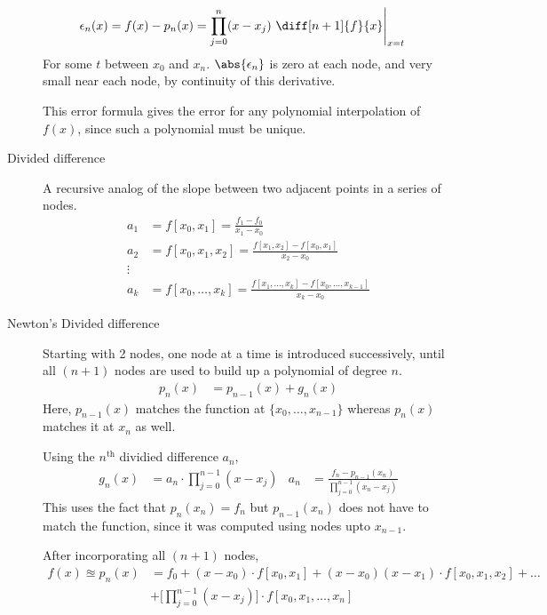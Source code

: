 \begin{description}
        \begin{align}
            \epsilon_n(x) & = f(x) - p_n(x)
            = \prod_{j=0}^{n} (x-x_j)\ \diff[n+1]{f}{x} \Bigg|_{x=t}
        \end{align}
        For some $ t $ between $ x_0 $ and $ x_n $. $ \abs{\epsilon_n} $ is zero at
        each node, and very small near each node, by continuity of this derivative.
        \par
        This error formula gives the error for any polynomial interpolation of $ f(x) $,
        since such a polynomial must be unique.

    \item[Divided difference] A recursive analog of the slope between two adjacent points
        in a series of nodes.
        \begin{align}
            a_1 & = f[x_0,x_1] = \frac{f_1 - f_0}{x_1 - x_0}                          \\
            a_2 & = f[x_0, x_1, x_2] = \frac{f[x_1,x_2] - f[x_0,x_1]}{x_2 - x_0}      \\
            \vdots \nonumber                                                          \\
            a_k & = f[x_0,\dots,x_k] = \frac{f[x_1,\dots,x_k] - f[x_0,\dots,x_{k-1}]}
            {x_k - x_0}
        \end{align}

    \item[Newton's Divided difference] Starting with 2 nodes, one node at a time is
        introduced successively, until all $ (n+1) $ nodes are used to build up a
        polynomial of degree $ n $.
        \begin{align}
            p_n(x) & = p_{n-1}(x) + g_n(x)
        \end{align}
        Here, $ p_{n-1}(x) $ matches the function at $ \{x_0,\dots,x_{n-1}\} $ whereas
        $ p_n(x) $ matches it at $ x_n $ as well. \par
        Using the $ n^{\text{th}} $ dividied difference $ a_n $,
        \begin{align}
            g_n(x) & = a_n \cdot \prod_{j=0}^{n-1} (x - x_j)                   &
            a_n    & = \frac{f_n - p_{n-1}(x_n)}{\prod_{j=0}^{n-1}(x_n - x_j)}
        \end{align}
        This uses the fact that $ p_n(x_n) = f_n $ but $ p_{n-1}(x_n) $ does not have to
        match the function, since it was computed using nodes upto $ x_{n-1} $. \par
        After incorporating all $ (n+1) $ nodes,
        \begin{align}
            f(x) \approxeq p_n(x) & = f_0 + (x - x_0) \cdot f[x_0, x_1]
            + (x-x_0)(x-x_1) \cdot f[x_0,x_1,x_2] + \dots                    \\
                                  & + \Bigg[\prod_{j=0}^{n-1}(x - x_j)\Bigg]
            \cdot f[x_0,x_1,\dots,x_n]
        \end{align}


\end{description}
